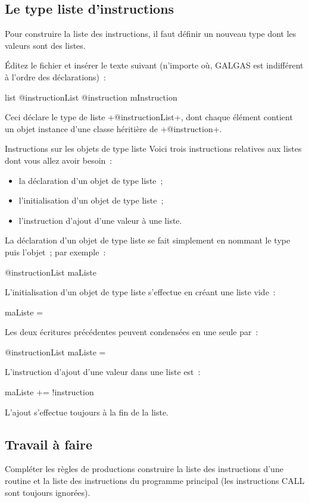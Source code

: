 \subsection{Le type liste d'instructions}
Pour construire la liste des instructions, il faut définir un nouveau type dont les valeurs sont des listes.

Éditez le fichier  et insérer le texte suivant (n’importe où, GALGAS est indifférent à l’ordre des déclarations)~:

\begin{galgas3}
list @instructionList {
  @instruction mInstruction
}
\end{galgas3}

Ceci déclare le type de liste \ggst+@instructionList+, dont chaque élément contient un objet instance d'une classe héritière de \ggst+@instruction+.

Instructions sur les objets de type liste
Voici trois instructions relatives aux listes dont vous allez avoir besoin~:
\begin{itemize}
  \item la déclaration d'un objet de type liste~;
  \item l'initialisation d'un objet de type liste~;
  \item l'instruction d'ajout d'une valeur à une liste.
\end{itemize}

La déclaration d'un objet de type liste se fait simplement en nommant le type puis l'objet~; par exemple~:
\begin{galgas3}
@instructionList maListe
\end{galgas3}

L'initialisation d'un objet de type liste s'effectue en créant une liste vide~:
\begin{galgas3}
maListe = {}
\end{galgas3}

Les deux écritures précédentes peuvent condensées en une seule par~:
\begin{galgas3}
@instructionList maListe = {}
\end{galgas3}

L'instruction d'ajout d'une valeur dans une liste est~:
\begin{galgas3}
maListe += !instruction
\end{galgas3}
L'ajout s'effectue toujours à la fin de la liste.

\subsection{Travail à faire}
Compléter les règles de productions construire la liste des instructions d'une routine et la liste des instructions du programme principal (les instructions CALL sont toujours ignorées).

